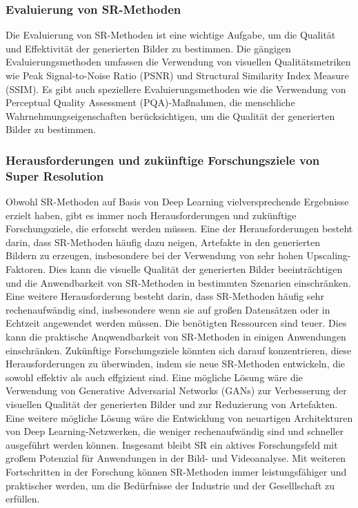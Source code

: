     \subsubsection{Evaluierung von SR-Methoden}
    
        Die Evaluierung von SR-Methoden ist eine wichtige Aufgabe, um die Qualität und Effektivität der generierten Bilder zu bestimmen. 
        Die gängigen Evaluierungsmethoden umfassen die Verwendung von visuellen Qualitätsmetriken wie Peak Signal-to-Noise Ratio (PSNR) und Structural Similarity Index Measure (SSIM).
        Es gibt auch speziellere Evaluierungsmethoden wie die Verwendung von Perceptual Quality Assessment (PQA)-Maßnahmen, die menschliche Wahrnehmungseigenschaften berücksichtigen, um die Qualität der generierten Bilder zu bestimmen.
    
    \subsubsection{Herausforderungen und zukünftige Forschungsziele von Super Resolution}
    
        Obwohl SR-Methoden auf Basis von Deep Learning vielversprechende Ergebnisse erzielt haben, gibt es immer noch Herausforderungen und zukünftige Forschungsziele, die erforscht werden müssen.
        Eine der Herausforderungen besteht darin, dass SR-Methoden häufig dazu neigen, Artefakte in den generierten Bildern zu erzeugen, insbesondere bei der Verwendung von sehr hohen Upscaling-Faktoren. %
        Dies kann die visuelle Qualität der generierten Bilder beeinträchtigen und die Anwendbarkeit von SR-Methoden in bestimmten Szenarien einschränken.
        Eine weitere Herausforderung besteht darin, dass SR-Methoden häufig sehr rechenaufwändig sind, insbesondere wenn sie auf großen Datensätzen oder in Echtzeit angewendet werden müssen. 
        Die benötigten Ressourcen sind teuer.
        Dies kann die praktische Anqwendbarkeit von SR-Methoden in einigen Anwendungen einschränken.   
        Zukünftige Forschungsziele könnten sich darauf konzentrieren, diese Herausforderungen zu überwinden, indem sie neue SR-Methoden entwickeln, die sowohl effektiv als auch effgizient sind. 
        Eine mögliche Lösung wäre die Verwendung von Generative Adversarial Networks (GANs) zur Verbesserung der visuellen Qualität der generierten Bilder und zur Reduzierung von Artefakten. %
        Eine weitere mögliche Lösung wäre die Entwicklung von neuartigen Architekturen von Deep Learning-Netzwerken, die weniger rechenaufwändig sind und schneller ausgeführt werden können.
        Insgesamt bleibt SR ein aktives Forschungsfeld mit großem Potenzial für Anwendungen in der Bild- und Videoanalyse. 
        Mit weiteren Fortschritten in der Forschung können SR-Methoden immer leistungsfähiger und praktischer werden, um die Bedürfnisse der Industrie und der Geselllschaft zu erfüllen.

